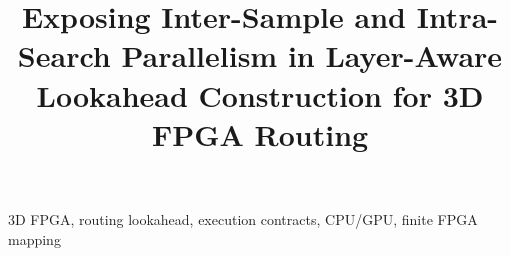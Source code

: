 \documentclass[conference,10pt,letterpaper]{IEEEtran}
\title{Exposing Inter-Sample and Intra-Search Parallelism in Layer-Aware Lookahead Construction for 3D FPGA Routing}
\author{\IEEEauthorblockN{Anonymous Authors}}
\begin{document}
\maketitle
\begin{abstract}\end{abstract}
\begin{IEEEkeywords}3D FPGA, routing lookahead, execution contracts, CPU/GPU, finite FPGA mapping\end{IEEEkeywords}











\clearpage


\end{document}
